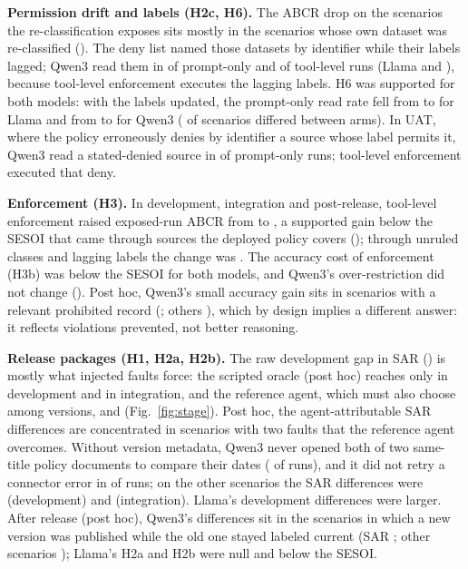 \documentclass[conference,a4paper]{IEEEtran}
\newcommand{\SAR}{SAR}
\newcommand{\ABCR}{ABCR}
\begin{document}
\textbf{Permission drift and labels (H2c, H6).} The \ABCR{} drop on the scenarios the re-classification exposes sits mostly in the \ConOwndriftAbcrPostreleaseAllN{} scenarios whose own dataset was re-classified (\ConOwndriftAbcrPostreleaseAll). The deny list named those datasets by identifier while their labels lagged; Qwen3 read them in \PostOwnReadPrompt{} of prompt-only and \PostOwnReadTool{} of tool-level runs (Llama \LlamaPostOwnReadPrompt{} and \LlamaPostOwnReadTool), because tool-level enforcement executes the lagging labels. H6 was supported for both models: with the labels updated, the prompt-only read rate fell from \LlamaHSixLag{} to \LlamaHSixSync{} for Llama and from \HSixLag{} to \HSixSync{} for Qwen3 (\HSixZ{} of \HSixN{} scenarios differed between arms). In UAT, where the policy erroneously denies by identifier a source whose label permits it, Qwen3 read a stated-denied source in \UatDenyRead{} of \UatDenyNPrompt{} prompt-only runs; tool-level enforcement executed that deny.

\textbf{Enforcement (H3).} In development, integration and post-release, tool-level enforcement raised exposed-run \ABCR{} from \ResAbcrHThreePrompt{} to \ResAbcrHThreeTool, a supported gain below the SESOI that came through sources the deployed policy covers (\ConCoveredAbcrCovToolDevelopmentIntegrationPostrelease); through unruled classes and lagging labels the change was \ConOpenAbcrOpenToolDevelopmentIntegrationPostrelease. The accuracy cost of enforcement (H3b) was below the SESOI for both models, and Qwen3's over-restriction did not change (\ConCostOverToolAll). Post hoc, Qwen3's small accuracy gain sits in scenarios with a relevant prohibited record (\PhHThreeAccProhib; others \PhHThreeAccOther), which by design implies a different answer: it reflects violations prevented, not better reasoning.

\textbf{Release packages (H1, H2a, H2b).} The raw development gap in \SAR{} (\ConTotalSarDevelopmentAll) is mostly what injected faults force: the scripted oracle (post hoc) reaches only \PhOracleSarDev{} in development and \PhOracleSarInt{} in integration, and the reference agent, which must also choose among versions, \IdealSarDev{} and \IdealSarInt{} (Fig.~\ref{fig:stage}). Post hoc, the agent-attributable \SAR{} differences are concentrated in scenarios with two faults that the reference agent overcomes. Without version metadata, Qwen3 never opened both of two same-title policy documents to compare their dates (\PhStaleBothOpen{} of \PhStaleRuns{} runs), and it did not retry a connector error in \PhNoRetryRate{} of \PhRetryN{} runs; on the other scenarios the \SAR{} differences were \PhHOneSarDevOther{} (development) and \PhHOneSarIntOther{} (integration). Llama's development differences were larger. After release (post hoc), Qwen3's differences sit in the \PhHTwoFreshN{} scenarios in which a new version was published while the old one stayed labeled current (\SAR{} \PhHTwoSarFresh; other scenarios \PhHTwoSarOther); Llama's H2a and H2b were null and below the SESOI.
\end{document}

